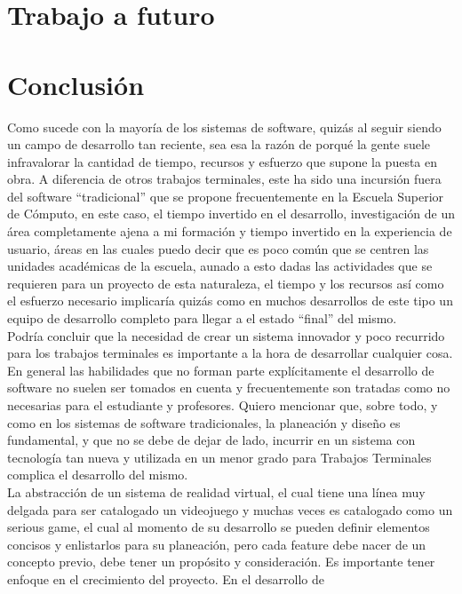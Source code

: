 \section{Trabajo a futuro}

\section{Conclusión}
Como sucede con la mayoría de los sistemas de software, quizás al seguir siendo un campo de desarrollo tan reciente, sea esa la razón de porqué 
la gente suele infravalorar la cantidad de tiempo, recursos y esfuerzo que supone la puesta en obra. A diferencia de otros trabajos terminales, 
este ha sido una incursión fuera del software “tradicional” que se propone frecuentemente en la Escuela Superior de Cómputo, en este caso, 
el tiempo invertido en el desarrollo, investigación de un área completamente ajena a mi formación y tiempo invertido en la experiencia de usuario, 
áreas en las cuales puedo decir que es poco común que se centren las unidades académicas de la escuela, aunado a esto dadas las actividades que se 
requieren para un proyecto de esta naturaleza, el tiempo y los recursos así como el esfuerzo necesario implicaría quizás como en muchos desarrollos 
de este tipo un equipo de desarrollo completo para llegar a el estado “final” del mismo.\\ 
Podría concluir que la necesidad de crear un sistema innovador y poco recurrido para los trabajos terminales es importante a la hora de desarrollar cualquier cosa.\\
En general las habilidades que no forman parte explícitamente el desarrollo de software no suelen ser tomados en cuenta y frecuentemente son tratadas 
como no necesarias para el estudiante y profesores. Quiero mencionar que, sobre todo, y como en los sistemas de software tradicionales, la planeación 
y diseño es fundamental, y que no se debe de dejar de lado, incurrir en un sistema con tecnología tan nueva y utilizada en un menor grado para Trabajos 
Terminales complica el desarrollo del mismo.\\
La abstracción de un sistema de realidad virtual, el cual tiene una línea muy delgada para ser catalogado un videojuego y muchas veces es catalogado 
como un serious game, el cual al momento de su desarrollo se pueden definir elementos concisos y enlistarlos para su planeación, pero cada feature debe 
nacer de un concepto previo, debe tener un propósito y consideración. Es importante tener enfoque en el crecimiento del proyecto. En el desarrollo de 
